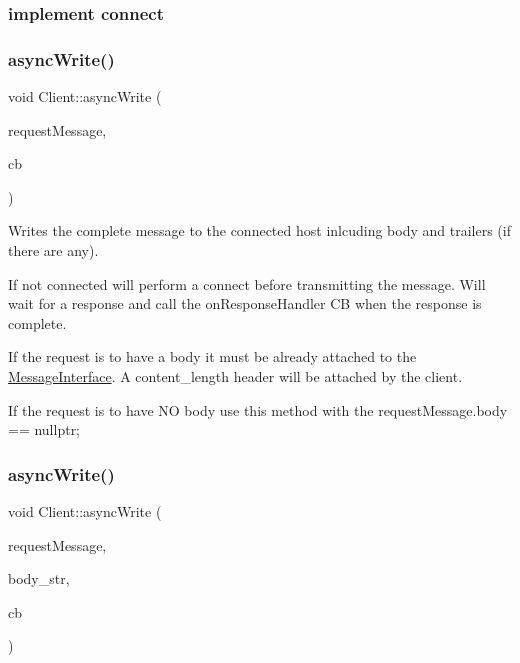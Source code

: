  \subsubsection*{implement connect }\mbox{\label{class_client_a7d9c259aa4e1262987eb3d4e909565e2}} 
\subsubsection{\texorpdfstring{async\+Write()}{asyncWrite()}\hspace{0.1cm}{\footnotesize\ttfamily [1/3]}}
{\footnotesize\ttfamily void Client\+::async\+Write (\begin{DoxyParamCaption}\item[{Message\+Base\+S\+Ptr}]{request\+Message,  }\item[{Response\+Handler\+Callback\+Type}]{cb }\end{DoxyParamCaption})}

Writes the complete message to the connected host inlcuding body and trailers (if there are any).

If not connected will perform a connect before transmitting the message. Will wait for a response and call the on\+Response\+Handler CB when the response is complete.

If the request is to have a body it must be already attached to the \hyperlink{class_message_interface}{Message\+Interface}. A content\+\_\+length header will be attached by the client.

If the request is to have NO body use this method with the request\+Message.\+body == nullptr; \mbox{\label{class_client_a4cc4752e98a0466c1dcbfb6791f1e226}} 
\subsubsection{\texorpdfstring{async\+Write()}{asyncWrite()}\hspace{0.1cm}{\footnotesize\ttfamily [2/3]}}
{\footnotesize\ttfamily void Client\+::async\+Write (\begin{DoxyParamCaption}\item[{Message\+Base\+S\+Ptr}]{request\+Message,  }\item[{std\+::string \&}]{body\+\_\+str,  }\item[{Response\+Handler\+Callback\+Type}]{cb }\end{DoxyParamCaption})}

